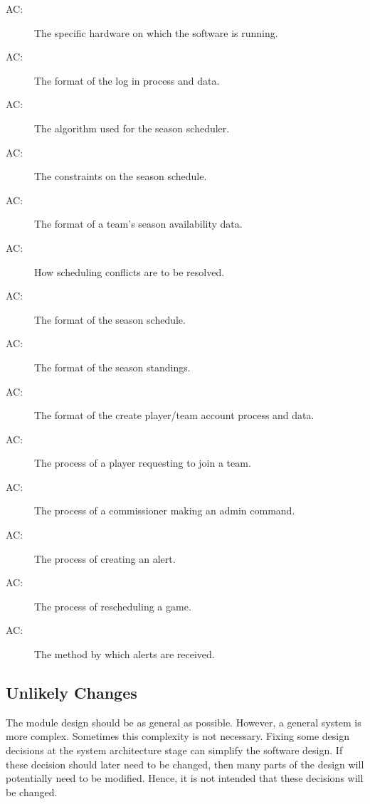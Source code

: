 \documentclass[12pt, titlepage]{article}
\newcounter{acnum}
\newcommand{\actheacnum}{AC\theacnum}
\begin{document}
\begin{description}
  \item[ \actheacnum \label{acHardware}:] The specific
  hardware on which the software is running.
  \item[ \actheacnum \label{acLogIn}:] The format of the
  log in process and data.
  \item[ \actheacnum \label{acSched}:] The algorithm
  used for the season scheduler.
  \item[ \actheacnum \label{acSchedConstraints}:] The
  constraints on the season schedule.
  \item[ \actheacnum \label{acAvailability}:] The format
  of a team's season availability data.
  \item[ \actheacnum \label{acSchedConflicts}:] How
  scheduling conflicts are to be resolved.
  \item[ \actheacnum \label{acSchedFormat}:] The format
  of the season schedule.
  \item[ \actheacnum \label{acStandFormat}:] The format
  of the season standings.
  \item[ \actheacnum \label{acCreateAccount}:] The
  format of the create player/team account process and data.
  \item[ \actheacnum \label{acJoinRequest}:] The process
  of a player requesting to join a team.
  \item[ \actheacnum \label{acAdmin}:] The process of a
  commissioner making an admin command.
  \item[ \actheacnum \label{acAlertSend}:] The process
  of creating an alert.
  \item[ \actheacnum \label{acReschedule}:] The process
  of rescheduling a game.
  \item[ \actheacnum \label{acAlertReceive}:] The method
  by which alerts are received.
\end{description}

\subsection{Unlikely Changes} \label{SecUchange}

The module design should be as general as possible. However, a general system is
more complex. Sometimes this complexity is not necessary. Fixing some design
decisions at the system architecture stage can simplify the software design. If
these decision should later need to be changed, then many parts of the design
will potentially need to be modified. Hence, it is not intended that these
decisions will be changed.
\end{document}
